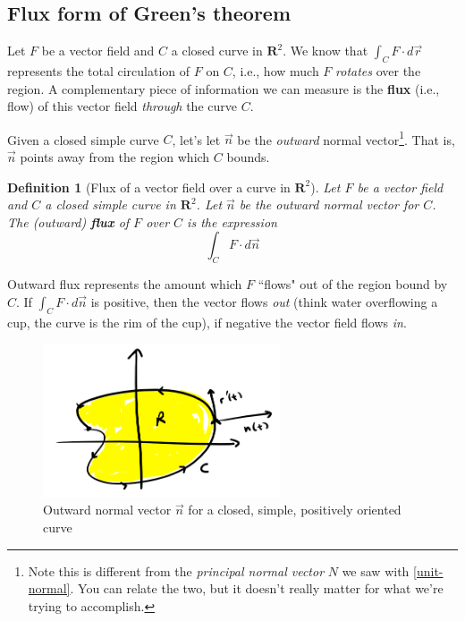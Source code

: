 \documentclass[12pt]{article}
\numberwithin{equation}{subsection}
\numberwithin{figure}{subsection}
\newtheorem{defn}[subsection]{Definition}
\theoremstyle{note}
\begin{document}
{\subsection{Flux form of Green's theorem} \label{flux-form-greens}
Let $F$ be a vector field and $C$ a closed curve in $\mathbf{R}^2$. We know that $ \int_C F \cdot d\vec{r}$ represents the total circulation of $F$ on $C$, i.e., how much $F$ \textit{rotates} over the region. A complementary piece of information we can measure is the \textbf{flux} (i.e., flow) of this vector field \textit{through} the curve $C$. 

Given a closed simple curve $C$, let's let $\vec{n}$ be the \textit{outward} normal vector\footnote{Note this is different from the \textit{principal normal vector} $N$ we saw with \eqref{unit-normal}. You can relate the two, but it doesn't really matter for what we're trying to accomplish.}. That is, $\vec{n}$ points away from the region which $C$ bounds. 
\begin{defn}[Flux of a vector field over a curve in $\mathbf{R}^2$]
	Let $F$ be a vector field and $C$ a closed simple curve in $\mathbf{R}^2$. Let $\vec{n}$ be the outward normal vector for $C$. The (outward) \textbf{flux} of $F$ over $C$ is the expression \begin{equation} \int_C F\cdot d\vec{n} \end{equation}
\end{defn}
Outward flux represents the amount which $F$ ``flows" out of the region bound by $C$. If $\int_C F\cdot d\vec{n}$ is positive, then the vector flows \textit{out} (think water overflowing a cup, the curve is the rim of the cup), if negative the vector field flows \textit{in}.

\begin{figure}[h!]
\centering
\includegraphics[width=70mm]{Images/normal-greens}
\caption{Outward normal vector $\vec{n}$ for a closed, simple, positively oriented curve} 
\label{fig-n-from-r}
\end{figure}


}
\end{document}
